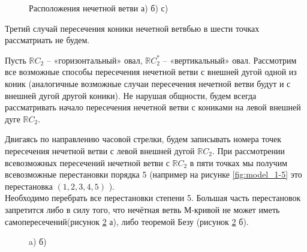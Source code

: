\documentclass[14pt]{article}
\begin{document}
\begin{figure}[H]
\caption{Расположения нечетной ветви а) б) с)}
\label{fig:curves_with_ovals}
\end{figure}

Третий случай пересечения коники нечетной ветвбью в шести точках рассматриать не будем.

Пусть $\mathbb RC_2$ – «горизонтальный» овал, $\mathbb RC_2^*$ – «вертикальный» овал. Рассмотрим все возможные способы пересечения нечетной ветви с внешней дугой одной из коник (аналогичные возможные случаи пересечения нечетной ветви будут и с внешней дугой другой коники). Не нарушая общности, будем всегда рассматривать начало пересечения нечетной ветви с кониками на левой внешней дуге $\mathbb RC_2$. 

Двигаясь по направлению часовой стрелки, будем записывать номера точек пересечения нечетной ветви с левой внешней дугой $\mathbb RC_2$. При рассмотрении всевозможных пересечений нечетной ветви с $\mathbb RC_2$ в пяти точках мы получим всевозможные перестановки порядка 5 (например на рисунке \ref{fig:model_1-5} это перестановка $(1,2,3,4,5)$ ).
\\
Необходимо перебрать все перестановки степени 5. Большая часть перестановок запретится либо в силу того, что нечётная ветвь М-кривой не может иметь самопересечений(рисунок \ref{fig:two_bad_ex} а), либо теоремой Безу (рисунок \ref{fig:two_bad_ex} б).

\begin{figure}[H]
        \caption{a) б)}
    \label{fig:two_bad_ex}
\end{figure}
\end{document}
